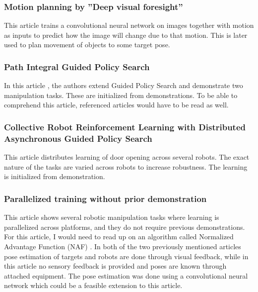 \subsubsection{Motion planning by ''Deep visual foresight''}

This article \cite{finn2016deep} trains a convolutional neural network on
images together with motion as inputs to predict how the image will change due
to that motion. This is later used to plan movement of objects to some target
pose.

\subsubsection{Path Integral Guided Policy Search}

In this article \cite{chebotar2016path}, the authors extend Guided Policy
Search and demonstrate two manipulation tasks. These are initialized from
demonstrations. To be able to comprehend this article, referenced articles
\cite{levine2016end,theodorou2010generalized,montgomery2016guided} would have
to be read as well.

\subsubsection{Collective Robot Reinforcement Learning with Distributed
               Asynchronous Guided Policy Search}

This article \cite{yahya2016collective} distributes learning of
door opening across several robots. The exact nature of the tasks
are varied across robots to increase robustness. The learning is
initialized from demonstration.

\subsubsection{Parallelized training without prior demonstration}

This article \cite{gu2016deep} shows several robotic manipulation tasks where
learning is parallelized across platforms, and they do not require previous
demonstrations.  For this article, I would need to read up on an algorithm
called Normalized Advantage Function (NAF) \cite{gu2016continuous}. In both of
the two previously mentioned articles
\cite{chebotar2016path,yahya2016collective} pose estimation of targets and
robots are done through visual feedback, while in this article
\cite{gu2016deep} no sensory feedback is provided and poses are known through
attached equipment. The pose estimation was done using a convolutional neural
network which could be a feasible extension to this article.



